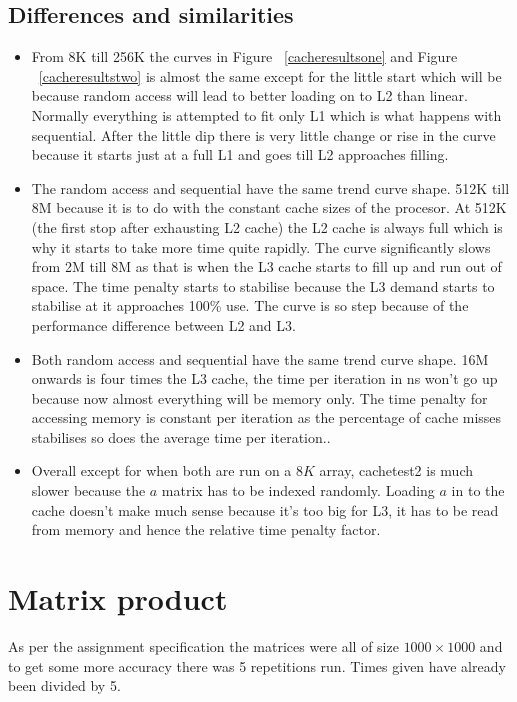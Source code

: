 \documentclass[10pt,a4paper]{article}
\begin{document}
    \subsection{Differences and similarities}
    \begin{itemize}
        \item From 8K till 256K the curves in Figure ~\ref{cacheresultsone} and Figure ~\ref{cacheresultstwo} is almost the same except for the little start which will be because random access will lead to better loading on to L2 than linear. Normally everything is attempted to fit only L1 which is what happens with sequential. After the little dip there is very little change or rise in the curve because it starts just at a full L1 and goes till L2 approaches filling.
        \item The random access and sequential have the same trend curve shape. 512K till 8M because it is to do with the constant cache sizes of the procesor. At 512K (the first stop after exhausting L2 cache) the L2 cache is always full which is why it starts to take more time quite rapidly. The curve significantly slows from 2M till 8M as that is when the L3 cache starts to fill up and run out of space. The time penalty starts to stabilise because the L3 demand starts to stabilise at it approaches 100\% use. The curve is so step because of the performance difference between L2 and L3.
        \item Both random access and sequential have the same trend curve shape. 16M onwards is four times the L3 cache, the time per iteration in ns won't go up because now almost everything will be memory only. The time penalty for accessing memory is constant per iteration as the percentage of cache misses stabilises so does the average time per iteration..
        \item Overall except for when both are run on a $8K$ array, cachetest2 is much slower because the $a$ matrix has to be indexed randomly. Loading $a$ in to the cache doesn't make much sense because it's too big for L3, it has to be read from memory and hence the relative time penalty factor.
    \end{itemize}

    \section{Matrix product}
    As per the assignment specification the matrices were all of size $1000\times1000$ and to get some more accuracy there was 5 repetitions run. Times given have already been divided by 5.
\end{document}
